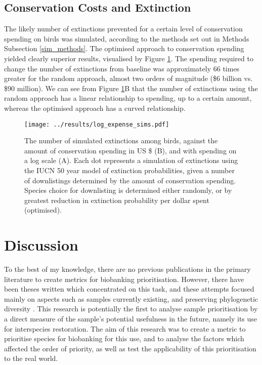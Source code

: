 \documentclass[12pt]{article}
\begin{document}
	
	\subsection{Conservation Costs and Extinction}
	The likely number of extinctions prevented for a certain level of
	conservation spending on birds was simulated, according to the
	methods set out in Methods Subsection \ref{sim_methods}. The optimised
	approach to conservation spending yielded clearly superior results,
	visualised by Figure \ref{expense_sims}. The spending required to
	change the number of extinctions from baseline was approximately
	66 times greater for the random approach, almost two orders of
	magnitude (\$6 billion vs. \$90 million). We can see from Figure
	\ref{expense_sims}B that the number of extinctions using the random approach
	has a linear relationship to spending, up to a certain amount, whereas
	the optimised approach has a curved relationship.
	
	
	\begin{figure}
		\centering
		\texttt{[image: ../results/log\_expense\_sims.pdf]}
		\caption{The number of simulated extinctions among birds, against
			the amount of conservation spending in US \$ (B), and with
			spending on a log scale (A). Each dot
			represents a simulation of extinctions using the IUCN 50 year
			model of extinction probabilities, given a number of
			downlistings determined by the amount of conservation
			spending. Species choice for downlisting is determined
			either randomly, or by greatest reduction in extinction
			probability per dollar spent (optimised).
			}\label{expense_sims}
	\end{figure}

	\pagebreak
	
	\section{Discussion}
	To the best of my knowledge, there are no previous publications in the
	primary literature to create metrics for
	biobanking prioritisation. However, there have been theses written which 
	concentrated
	on this task, and these attempts focused mainly on aspects such as
	samples currently existing, and preserving phylogenetic diversity 
	\citep{mooneyValueExSitu2021,harwoodDevelopingImplementingPrioritisation2021}.
	This research is potentially
	the first to analyse sample prioritisation by
	a direct measure of the sample's potential usefulness in the future,
	namely its use for interspecies restoration. The aim of this research
	was to create a metric to prioritise species for biobanking for this
	use, and to analyse the factors which affected the order of priority,
	as well as test the applicability of this prioritisation to the
	real world.
	
\end{document}

